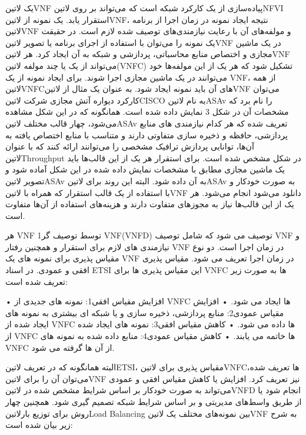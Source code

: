 \documentclass{book}
\begin{document}
یک ‌لاتین{VNF} پیاده‌سازی از یک کارکرد شبکه است که می‌تواند بر روی ‌لاتین{NFVI} استقرار یابد.
یک نمونه از ‌لاتین{VNF}، نتیجه ایجاد نمونه در زمان اجرا از برنامه ‌لاتین{VNF} و مولفه‌های آن با رعایت نیازمندی‌های توصیف شده لازم است.
در حقیقت یک نمونه را می‌توان با استفاده از اجرای برنامه یا تصویر ‌لاتین{VNF} در یک ماشین مجازی و اختصاص منابع محاسباتی، پردازشی و شبکه به آن ایجاد کرد.
هر ‌لاتین{VNF} می‌تواند از یک یا چند مولفه ‌لاتین{(VNFC)} تشکیل شود که هر یک از این مولفه‌ها خود می‌توانند در یک ماشین مجازی اجرا شوند.
برای ایجاد نمونه از یک ‌{VNF}، از همه ‌لاتین{VNFC}های آن باید نمونه ایجاد شود.
به عنوان یک مثال از ‌لاتین{VNF} می‌توان کارکرد دیواره آتش مجازی شرکت ‌لاتین{CISCO} به نام ‌لاتین{ASAv} را نام برد که مشخصات آن در شکل 3 نمایش داده شده است.
همانگونه که در این شکل مشاهده می‌شود، چهار قالب مختلف ‌لاتین{ASAv} تعریف شده که هر کدام نیازمندی های منابع پردازشی، حافظه و ذخیره سازی متفاوتی دارند و متناسب با منابع اختصاص یافته به آن‌ها،
توانایی پردازش ترافیک مشخصی را می‌توانند ارائه کنند که با عنوان ‌لاتین{Throughput} در شکل مشخص شده است. برای استقرار هر یک از این قالب‌ها باید یک ماشین مجازی مطابق با
مشخصات نمایش داده شده در این شکل آماده شود و تصویر ‌لاتین{ASAv} به آن داده شود.
البته این روند برای ‌لاتین{ASAv} به صورت خودکار و با استفاده از یک قالب استقرار که همراه با ‌لاتین{VNF} دانلود می‌شود انجام می‌شود.
هر یک از این قالب‌ها نیاز به مجوزهای متفاوت دارند و هزینه‌های استفاده از آن‌ها متفاوت است.

هر VNF توسط توصیف گر1 VNF(VNFD) توصیف می شود که شامل توصیف VNF و نیازمندی های لازم برای استقرار و همچنین رفتار VNF در زمان اجرا است. دو نوع مقیاس پذیری برای نمونه های یک VNF در زمان اجرا تعریف می شود. مقیاس پذیری افقی و عمودی. در اسناد ETSI این مقیاس پذیری ها برای VNFC ها به صورت زیر تعریف شده است:

    • افزایش مقیاس افقی1:  نمونه های جدیدی از VNFC ها ایجاد می شود.
    • افزایش مقیاس عمودی2: منابع پردازشی، ذخیره سازی و یا شبکه ای بیشتری به نمونه های ایجاد شده از VNFC ها داده می شود.
    • کاهش مقیاس افقی3: نمونه های ایجاد شده از VNFC ها خاتمه می یابند.
    • کاهش مقیاس عمودی4: منابع داده شده به نمونه های VNFC از آن ها گرفته می شود.

البته همانگونه که در تعریف ‌لاتین{ETSI}، مقیاس پذیری برای ‌لاتین{VNFC}ها تعریف شده، می‌توان آن را برای ‌لاتین{VNF} نیز تعریف کرد.
افزایش یا کاهش مقیاس افقی و عمودی می‌تواند به صورت خودکار بر اساس شرایط مشخص شده در ‌لاتین{VNFD} انجام شود یا از طریق واسط‌های مدیریتی و بر اساس شرایط شبکه تصمیم گیری شود.
همچنین چهار روش برای توزیع بار‌لاتین{Load Balancing} بین نمونه‌های مختلف یک ‌لاتین{VNF} به شرح زیر بیان شده است:
\end{document}
